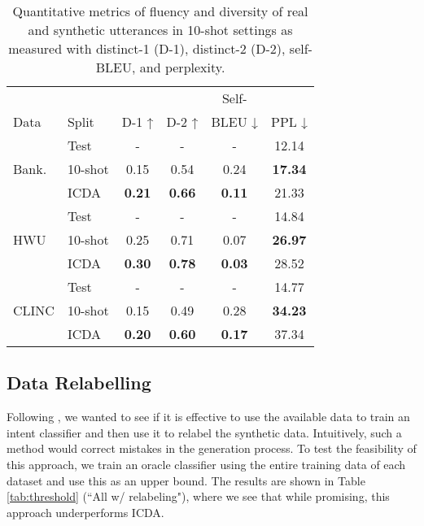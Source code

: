\documentclass[11pt]{article}
\begin{document}
\begin{table}[]
\centering
\small
\begin{tabular}{llcccc}
\toprule
& & & & Self- & \\
Data & Split & D-1 ↑ & D-2 ↑ & BLEU ↓ & PPL ↓ \\
\midrule
\multirow{3}{*}{Bank.} & Test          & -        & -        & -           & 12.14 \\
\cline{2-6}
		& 10-shot & 0.15   & 0.54   & 0.24      & \textbf{17.34} \\
        & ICDA & \textbf{0.21}   & \textbf{0.66}   & \textbf{0.11}      & 21.33 \\
        \hline
\multirow{3}{*}{HWU}     & Test          & -        & -        & -           & 14.84 \\
\cline{2-6}
        & 10-shot & 0.25   & 0.71   & 0.07      & \textbf{26.97} \\
        & ICDA & \textbf{0.30}   & \textbf{0.78}   & \textbf{0.03}      & 28.52 \\
        \hline
\multirow{3}{*}{CLINC}   & Test          & -        & -        & -           & 14.77 \\
\cline{2-6}
		& 10-shot & 0.15   & 0.49   & 0.28      & \textbf{34.23} \\
        & ICDA & \textbf{0.20}   & \textbf{0.60}   & \textbf{0.17}      & 37.34\\
\bottomrule
\end{tabular}
\caption{Quantitative metrics of fluency and diversity of real and synthetic utterances in 10-shot settings as measured with distinct-1 (D-1), distinct-2 (D-2), self-BLEU, and perplexity.}
\label{tab:distint_ppl}
\end{table}









\subsection{Data Relabelling}
Following \citet{sahu-etal-2022-data}, we wanted to see if it is effective to use the available data to train an intent classifier and then use it to relabel the synthetic data. Intuitively, such a method would correct mistakes in the generation process. To test the feasibility of this approach, we train an oracle classifier using the entire training data of each dataset and use this as an upper bound. The results are shown in Table \ref{tab:threshold} (``All w/ relabeling"), where we see that while promising, this approach underperforms ICDA. 
\end{document}
